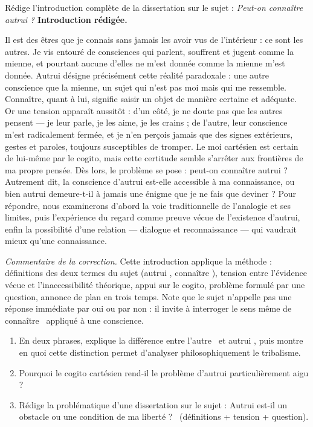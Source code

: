 \documentclass[11pt]{article}
\begin{document}
\begin{exoresolu}
Rédige l'introduction complète de la dissertation sur le sujet : \emph{Peut-on connaître autrui ?}
\tcblower
\textbf{Introduction rédigée.}

Il est des êtres que je connais sans jamais les avoir vus de l'intérieur : ce sont les autres. Je vis entouré de consciences qui parlent, souffrent et jugent comme la mienne, et pourtant aucune d'elles ne m'est donnée comme la mienne m'est donnée. Autrui désigne précisément cette réalité paradoxale : une autre conscience que la mienne, un sujet qui n'est pas moi mais qui me ressemble. Connaître, quant à lui, signifie saisir un objet de manière certaine et adéquate. Or une tension apparaît aussitôt : d'un côté, je ne doute pas que les autres pensent — je leur parle, je les aime, je les crains ; de l'autre, leur conscience m'est radicalement fermée, et je n'en perçois jamais que des signes extérieurs, gestes et paroles, toujours susceptibles de tromper. Le moi cartésien est certain de lui-même par le cogito, mais cette certitude semble s'arrêter aux frontières de ma propre pensée. Dès lors, le problème se pose : peut-on connaître autrui ? Autrement dit, la conscience d'autrui est-elle accessible à ma connaissance, ou bien autrui demeure-t-il à jamais une énigme que je ne fais que deviner ? Pour répondre, nous examinerons d'abord la voie traditionnelle de l'analogie et ses limites, puis l'expérience du regard comme preuve vécue de l'existence d'autrui, enfin la possibilité d'une relation — dialogue et reconnaissance — qui vaudrait mieux qu'une connaissance.

\emph{Commentaire de la correction.} Cette introduction applique la méthode : définitions des deux termes du sujet (\guillemotleft autrui \guillemotright, \guillemotleft connaître \guillemotright), tension entre l'évidence vécue et l'inaccessibilité théorique, appui sur le cogito, problème formulé par une question, annonce de plan en trois temps. Note que le sujet n'appelle pas une réponse immédiate par oui ou par non : il invite à interroger le sens même de \guillemotleft connaître \guillemotright\ appliqué à une conscience.
\end{exoresolu}

\begin{exercice}
\begin{enumerate}
\item En deux phrases, explique la différence entre \guillemotleft l'autre \guillemotright\ et \guillemotleft autrui \guillemotright, puis montre en quoi cette distinction permet d'analyser philosophiquement le tribalisme.
\item Pourquoi le cogito cartésien rend-il le problème d'autrui particulièrement aigu ?
\item Rédige la problématique d'une dissertation sur le sujet : \guillemotleft Autrui est-il un obstacle ou une condition de ma liberté ? \guillemotright\ (définitions + tension + question).
\end{enumerate}
\end{exercice}
\end{document}
